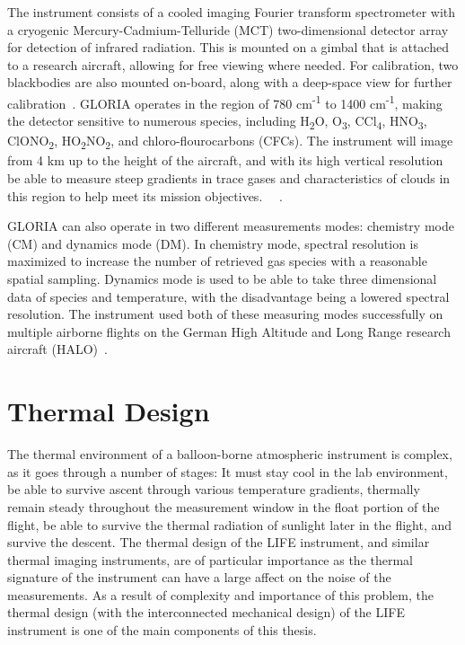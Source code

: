 The instrument consists of a cooled imaging Fourier transform spectrometer with a cryogenic Mercury-Cadmium-Telluride (MCT) two-dimensional detector array for detection of infrared radiation. This is mounted on a gimbal that is attached to a research aircraft, allowing for free viewing where needed. For calibration, two blackbodies are also mounted on-board, along with a deep-space view for further calibration~\citep{GLORIA_concept}. GLORIA operates in the region of  780 cm\textsuperscript{-1} to 1400 cm\textsuperscript{-1}, making the detector sensitive to numerous species, including H\textsubscript{2}O, O\textsubscript{3}, CCl\textsubscript{4}, HNO\textsubscript{3}, ClONO\textsubscript{2}, HO\textsubscript{2}NO\textsubscript{2}, and chloro-flourocarbons (CFCs). The instrument will image from 4 km up to the height of the aircraft, and with its high vertical resolution be able to measure steep gradients in trace gases and characteristics of clouds in this region to help meet its mission objectives. ~\citep{GLORIA_PhD}~\citep{GLORIA_objectives}.

GLORIA can also operate in two different measurements modes: chemistry mode (CM) and dynamics mode (DM). In chemistry mode, spectral resolution is maximized to increase the number of retrieved gas species with a reasonable spatial sampling. Dynamics mode is used to be able to take three dimensional data of species and temperature, with the disadvantage being a lowered spectral resolution. The instrument used both of these measuring modes successfully on multiple airborne flights on the German High Altitude and Long Range research aircraft (HALO)~\citep{GLORIA_concept}. 

\section{Thermal Design}
The thermal environment of a balloon-borne atmospheric instrument is complex, as it goes through a number of stages: It must stay cool in the lab environment, be able to survive ascent through various temperature gradients, thermally remain steady throughout the measurement window in the float portion of the flight, be able to survive the thermal radiation of sunlight later in the flight, and survive the descent. The thermal design of the LIFE instrument, and similar thermal imaging instruments, are of particular importance as the thermal signature of the instrument can have a large affect on the noise of the measurements. As a result of complexity and importance of this problem, the thermal design (with the interconnected mechanical design) of the LIFE instrument is one of the main components of this thesis. 


